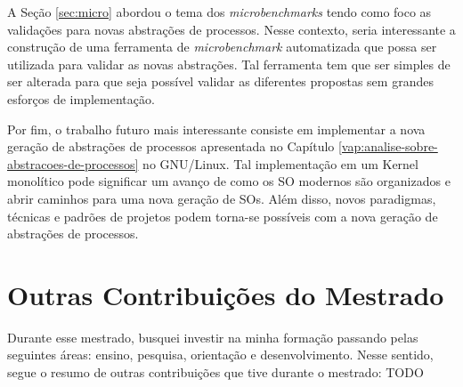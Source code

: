 A Seção \ref{sec:micro} abordou o tema dos \textit{microbenchmarks} tendo como
foco as validações para novas abstrações de processos. Nesse contexto, seria
interessante a construção de uma ferramenta de \textit{microbenchmark}
automatizada que possa ser utilizada para validar as novas abstrações. Tal
ferramenta tem que ser simples de ser alterada para que seja possível validar
as diferentes propostas sem grandes esforços de implementação.

Por fim, o trabalho futuro mais interessante consiste em implementar a nova
geração de abstrações de processos apresentada no Capítulo
\ref{vap:analise-sobre-abstracoes-de-processos} no GNU/Linux. Tal implementação
em um Kernel monolítico pode significar um avanço de como os SO modernos são
organizados e abrir caminhos para uma nova geração de SOs. Além disso, novos
paradigmas, técnicas e padrões de projetos podem torna-se possíveis com a nova
geração de abstrações de processos.

\section{Outras Contribuições do Mestrado}

Durante esse mestrado, busquei investir na minha formação passando pelas
seguintes áreas: ensino, pesquisa, orientação e desenvolvimento. Nesse sentido,
segue o resumo de outras contribuições que tive durante o mestrado: TODO
